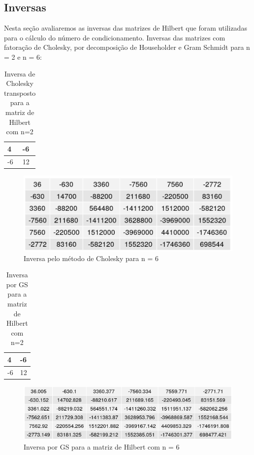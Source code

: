 \documentclass[12pt, a4paper]{article}
\begin{document}






\subsection{Inversas}
Nesta seção avaliaremos as inversas das matrizes de Hilbert que foram utilizadas para o cálculo do número de condicionamento.
Inversas das matrizes com fatoração de Cholesky, por decomposição de Householder e Gram Schmidt para n = 2 e n = 6:
\begin{table}[!htbp]
\caption{Inversa de Cholesky transposto para a matriz de Hilbert com n=2}
\centering
\begin{tabular}{|l|l|}
\hline
4 & -6  \\
\hline
-6 & 12\\
\hline
\end{tabular}
\end{table}

\begin{figure}[!htbp]
    \centering
    \includegraphics[]{matrizes/matriz_HINVERSA_CH6.png}
    \caption{ Inversa pelo método de Cholesky para n = 6}
    \label{fig:my_label}
\end{figure}

\begin{table}[!htbp]
\caption{Inversa por GS para a matriz de Hilbert com n=2}
\centering
\begin{tabular}{|l|l|}
\hline
4 & -6  \\
\hline
-6 & 12\\
\hline
\end{tabular}
\end{table}

\begin{figure}[!htbp]
    \centering
    \includegraphics[width = 15cm]{matrizes/matriz_HINVERSA_GR6.png}
    \caption{Inversa por GS para a matriz de Hilbert com n = 6}
    \label{fig:my_label}
\end{figure}
\end{document}
